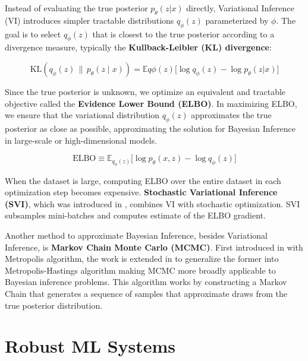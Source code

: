 \documentclass[ %
                    author={Revalda Putawara},
                supervisor={Dr. James Pope},
                    degree={MSc},
                     title={Robustness of Bayesian Neural Networks Design Choices Against Weight and Bias Perturbation Induced by Single Event Upsets (SEUs)},
                      type={},
                      year={2025}]{dissertation}
\begin{document}
Instead of evaluating the true posterior $p_{\theta}(z|x)$ directly, Variational Inference (VI) introduces simpler tractable distributions $q_{\phi}(z)$ parameterized by $\phi$. The goal is to select $q_{\phi}(z)$ that is closest to the true posterior according to a divergence measure, typically the \textbf{Kullback-Leibler (KL) divergence}:

\begin{equation}
\mathrm{KL}\!\left(q_\phi(z)\,\|\,p_\theta(z \mid x)\right) = \mathbb{E}{q\phi(z)} \big[\log q_\phi(z) - \log p_\theta(z|x)\big]
\end{equation}

Since the true posterior is unknown, we optimize an equivalent and tractable objective called the \textbf{Evidence Lower Bound (ELBO)}. In maximizing ELBO, we ensure that the variational distribution $q_{\phi}(z)$ approximates the true posterior as close as possible, approximating the solution for Bayesian Inference in large-scale or high-dimensional models.

\begin{equation} \label{eq:genericelbo}
\text{ELBO} \equiv \mathbb{E}_{q_\phi(z)} \big[ \log p_\theta(x, z) - \log q_\phi(z) \big]
\end{equation}

When the dataset is large, computing ELBO over the entire dataset in each optimization step becomes expensive. \textbf{Stochastic Variational Inference (SVI)}, which was introduced in \cite{Hoffman2013}, combines VI with stochastic optimization. SVI subsamples mini-batches and computes estimate of the ELBO gradient.

Another method to approximate Bayesian Inference, besides Variational Inference, is \textbf{Markov Chain Monte Carlo (MCMC)}. First introduced in \cite{Metropolis:1953am} with Metropolis algorithm, the work is extended in \cite{Hastings1970} to generalize the former into Metropolis-Hastings algorithm making MCMC more broadly applicable to Bayesian inference problems. This algorithm works by constructing a Markov Chain that generates a sequence of samples that approximate draws from the true posterior distribution.



\section{Robust ML Systems}
\end{document}
